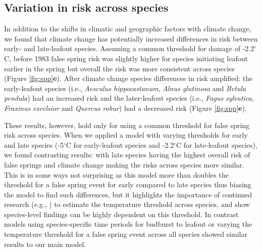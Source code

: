 \documentclass{article}\usepackage[]{graphicx}\usepackage[]{color}
\newcommand{\R}[1]{\label{#1}\linelabel{#1}}
\begin{document}
\subsection*{Variation in risk across species} 
In addition to the shifts in climatic and geographic factors with climate change, we found that climate change has potentially increased differences in risk between early- and late-leafout species. Assuming a common threshold for damage of -2.2$^{\circ}$C, before 1983 false spring risk was slightly higher for species initiating leafout earlier in the spring but overall the risk was more consistent across species (Figure \ref{fig:spp}\textbf{e}). After climate change species differences in risk amplified: the early-leafout species (i.e., \textit{Aesculus hippocastanum}, \textit{Alnus glutinosa} and \textit{Betula pendula}) had an increased risk and the later-leafout species (i.e., \textit{Fagus sylvatica}, \textit{Fraxinus excelsior} and \textit{Quercus robur}) had a decreased risk (Figure \ref{fig:spp}\textbf{e}). 

\R{Z3thresh}These results, however, hold only for using a common threshold for false spring risk across species. When we applied a model with varying thresholds for early and late species (-5$^{\circ}$C for early-leafout species and -2.2$^{\circ}$C for late-leafout species), we found contrasting results: with late species having the highest overall risk of false springs and climate change making the risks across species more similar. This is in some ways not surprising as this model more than doubles the threshold for a false spring event for early compared to late species thus biasing the model to find such differences, but it highlights the importance of continued research (e.g., \citep{Lenz2013,Muffler2016,Zohner2020}) to estimate the temperature threshold across species, and show species-level findings can be highly dependent on this threshold. In contrast models using species-specific time periods for budburst to leafout or varying the temperature threshold for a false spring event across all species showed similar results to our main model\R{Z3threshend}.
\end{document}
